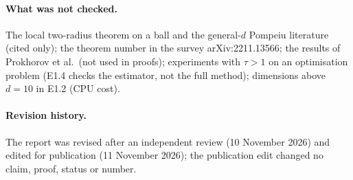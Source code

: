 \documentclass[11pt,a4paper]{article}
\numberwithin{equation}{section}
\theoremstyle{definition}
\theoremstyle{remark}
\begin{document}
\paragraph{What was not checked.} The local two-radius theorem on a ball and the general-$d$ Pompeiu literature (cited only); the theorem number in the survey arXiv:2211.13566; the results of Prokhorov et al.\ (not used in proofs); experiments with $\tau>1$ on an optimisation problem (E1.4 checks the estimator, not the full method); dimensions above $d=10$ in E1.2 (CPU cost).

\paragraph{Revision history.} The report was revised after an independent review (10 November 2026) and edited for publication (11 November 2026); the publication edit changed no claim, proof, status or number.
\end{document}
